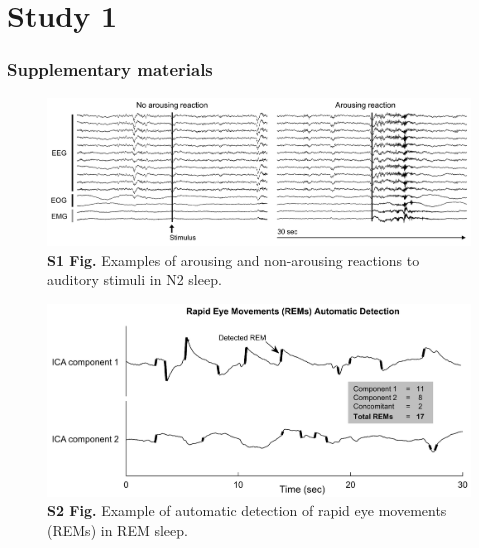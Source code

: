 \cleardoublepage

\chapter{Study 1}
\label{res:arousal}

\cleardoublepage



\cleardoublepage

\subsection*{Supplementary materials}
\label{res:arousal:supp}
\vspace*{1cm}

\begin{figure}[htbp]
	\includegraphics[width=\textwidth]{Fig/Results/Arousals/S1_Fig.png}
	\caption*{\textbf{S1 Fig.} Examples of arousing and non-arousing reactions to auditory stimuli in N2 sleep.}
\end{figure}

\vspace*{3cm}

\begin{figure}[htbp]
	\includegraphics[width=\textwidth]{Fig/Results/Arousals/S2_Fig.png}
	\caption*{\textbf{S2 Fig.} Example of automatic detection of rapid eye movements (REMs) in REM sleep. }
\end{figure}

